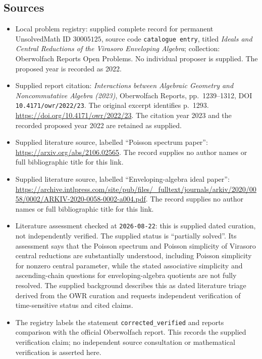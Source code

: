\documentclass[11pt]{article}
\begin{document}
\subsection{Sources}
\begin{itemize}
\item Local problem registry: supplied complete record for permanent UnsolvedMath ID \(30005125\), source code \texttt{catalogue entry}, titled \emph{Ideals and Central Reductions of the Virasoro Enveloping Algebra}; collection: Oberwolfach Reports Open Problems. No individual proposer is supplied. The proposed year is recorded as 2022.
\item Supplied report citation: \emph{Interactions between Algebraic Geometry and Noncommutative Algebra (2023)}, Oberwolfach Reports, pp.\ 1239--1312, DOI \texttt{10.4171/owr/2022/23}. The original excerpt identifies p.\ 1293. \url{https://doi.org/10.4171/owr/2022/23}. The citation year 2023 and the recorded proposed year 2022 are retained as supplied.
\item Supplied literature source, labelled ``Poisson spectrum paper'': \url{https://arxiv.org/abs/2106.02565}. The record supplies no author names or full bibliographic title for this link.
\item Supplied literature source, labelled ``Enveloping-algebra ideal paper'': \url{https://archive.intlpress.com/site/pub/files/_fulltext/journals/arkiv/2020/0058/0002/ARKIV-2020-0058-0002-a004.pdf}. The record supplies no author names or full bibliographic title for this link.
\item Literature assessment checked at \texttt{2026-08-22}: this is supplied dated curation, not independently verified. The supplied status is ``partially solved''. Its assessment says that the Poisson spectrum and Poisson simplicity of Virasoro central reductions are substantially understood, including Poisson simplicity for nonzero central parameter, while the stated associative simplicity and ascending-chain questions for enveloping-algebra quotients are not fully resolved. The supplied background describes this as dated literature triage derived from the OWR curation and requests independent verification of time-sensitive status and cited claims.
\item The registry labels the statement \texttt{corrected\_verified} and reports comparison with the official Oberwolfach report. This records the supplied verification claim; no independent source consultation or mathematical verification is asserted here.
\end{itemize}
\end{document}
